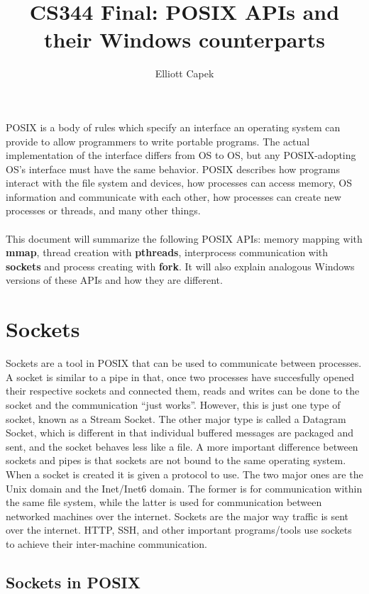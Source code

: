 \documentclass[11pt]{article}
\begin{document}
\title{CS344 Final: POSIX APIs and their Windows counterparts}
\author{Elliott Capek}
\maketitle

POSIX is a body of rules which specify an interface an operating system can provide to allow programmers to write portable programs. The actual implementation of the interface differs from OS to OS, but any POSIX-adopting OS's interface must have the same behavior. POSIX describes how programs interact with the file system and devices, how processes can access memory, OS information and communicate with each other, how processes can create new processes or threads, and many other things. \\ \\
This document will summarize the following POSIX APIs: memory mapping with \textbf{mmap}, thread creation with \textbf{pthreads}, interprocess communication with \textbf{sockets} and process creating with \textbf{fork}. It will also explain analogous Windows versions of these APIs and how they are different.\\

\section{Sockets}
Sockets are a tool in POSIX that can be used to communicate between processes. A socket is similar to a pipe in that, once two processes have succesfully opened their respective sockets and connected them, reads and writes can be done to the socket and the communication ``just works''. However, this is just one type of socket, known as a Stream Socket. The other major type is called a Datagram Socket, which is different in that individual buffered messages are packaged and sent, and the socket behaves less like a file. A more important difference between sockets and pipes is that sockets are not bound to the same operating system. When a socket is created it is given a protocol to use. The two major ones are the Unix domain and the Inet/Inet6 domain. The former is for communication within the same file system, while the latter is used for communication between networked machines over the internet. Sockets are the major way traffic is sent over the internet. HTTP, SSH, and other important programs/tools use sockets to achieve their inter-machine communication.

\subsection{Sockets in POSIX}
\end{document}

